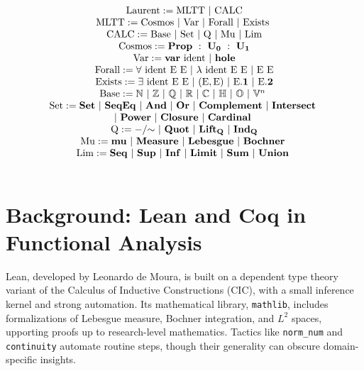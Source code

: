 \documentclass{article}
\begin{document}
$$
\begin{array}{c} \\
   \mathrm{Laurent} := \mathrm{MLTT}\ |\ \mathrm{CALC} \\
   \mathrm{MLTT} := \mathrm{Cosmos}\ |\ \mathrm{Var}\ |\ \mathrm{Forall}\ |\ \mathrm{Exists}\ \\
   \mathrm{CALC} := \mathrm{Base}\ |\ \mathrm{Set}\ |\ \mathrm{Q}\ |\ \mathrm{Mu}\ |\ \mathrm{Lim} \\
   \mathrm{Cosmos} := \mathbf{Prop}\ :\ \mathbf{U_0}\ :\ \mathbf{U_1} \\
   \mathrm{Var} := \mathbf{var}\ \mathrm{ident}\ |\ \mathbf{hole} \\
   \mathrm{Forall} := \forall\ \mathrm{ident}\ \mathrm{E}\ \mathrm{E}\ |\ \lambda\ \mathrm{ident}\ \mathrm{E}\ \mathrm{E}\ |\ \mathrm{E}\ \mathrm{E} \\
   \mathrm{Exists} := \exists\ \mathrm{ident}\ \mathrm{E}\ \mathrm{E}\ |\ (\mathrm{E}, \mathrm{E})\ |\ \mathrm{E}\mathbf{.1}\ |\ \mathrm{E}\mathbf{.2} \\
   \mathrm{Base} := \mathbb{N}\ |\ \mathbb{Z}\ |\ \mathbb{Q}\ |\ \mathbb{R}\ |\ \mathbb{C}\ |\ \mathbb{H}\ |\ \mathbb{O}\ |\ \mathbb{V}^n\ \\
   \mathrm{Set} := \mathbf{Set}\ |\ \mathbf{SeqEq}\ |\ \mathbf{And}\ |\ \mathbf{Or}\ 
                |\ \mathbf{Complement}\ |\ \mathbf{Intersect}\ \\
                |\ \mathbf{Power}\ |\ \mathbf{Closure}\ |\ \mathbf{Cardinal}\ \\
   \mathrm{Q} := \mathbf{-/\hspace{-1mm}\sim}\ |\ \mathbf{Quot}\ |\ \mathbf{Lift_Q}\ |\ \mathbf{Ind_Q} \\
   \mathrm{Mu} := \mathbf{mu}\ |\ \mathbf{Measure}\ 
                |\ \mathbf{Lebesgue}\ |\ \mathbf{Bochner}\ \\
   \mathrm{Lim} := \mathbf{Seq}\ |\ \mathbf{Sup}\ |\ \mathbf{Inf}\ 
               |\ \mathbf{Limit}\ |\ \mathbf{Sum}\ |\ \mathbf{Union}\ \\
         \\
\end{array}
$$

\section{Background: Lean and Coq in Functional Analysis}
Lean, developed by Leonardo de Moura, is built on a dependent type theory variant
of the Calculus of Inductive Constructions (CIC), with a small inference kernel
and strong automation. Its mathematical library, \texttt{mathlib},
includes formalizations of Lebesgue measure, Bochner integration, and $L^2$ spaces,
upporting proofs up to research-level mathematics.
Tactics like \texttt{norm\_num} and \texttt{continuity} automate routine steps,
though their generality can obscure domain-specific insights.
\end{document}
